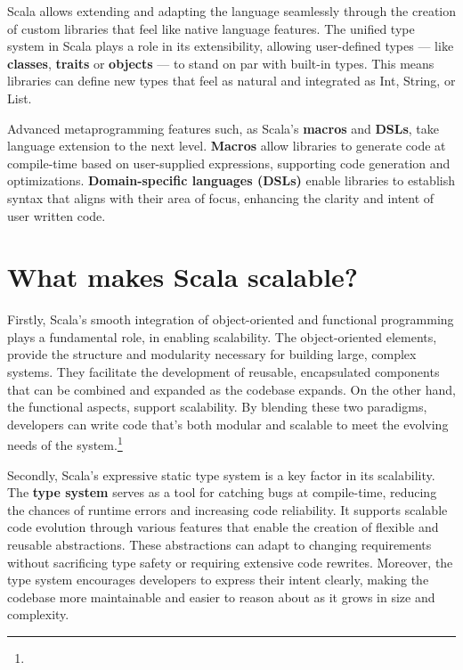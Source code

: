 Scala allows extending and adapting the language seamlessly through the creation of custom libraries that feel like native language features. The unified type system in Scala plays a role in its extensibility, allowing user-defined types — like  \textbf{classes}, \textbf{traits} or \textbf{objects} — to stand on par with built-in types. This means libraries can define new types that feel as natural and integrated as Int, String, or List.\footnotemark{}

Advanced metaprogramming features such, as Scala's \textbf{macros} and \textbf{DSLs}, take language extension to the next level. \textbf{Macros} allow libraries to generate code at compile-time based on user-supplied expressions, supporting code generation and optimizations. \textbf{Domain-specific languages (DSLs)} enable libraries to establish syntax that aligns with their area of focus, enhancing the clarity and intent of user written code.\footnotemark[\value{footnote}] 

\section{What makes Scala scalable?}

Firstly, Scala's smooth integration of object-oriented and functional programming plays a fundamental role, in enabling scalability. The object-oriented elements, provide the structure and modularity necessary for building large, complex systems. They facilitate the development of reusable, encapsulated components that can be combined and expanded as the codebase expands. On the other hand, the functional aspects, support scalability. By blending these two paradigms, developers can write code that's both modular and scalable to meet the evolving needs of the system.\footnote[1]{}

Secondly, Scala's expressive static type system is a key factor in its scalability. The \textbf{type system} serves as a tool for catching bugs at compile-time, reducing the chances of runtime errors and increasing code reliability. It supports scalable code evolution through various features that enable the creation of flexible and reusable abstractions. These abstractions can adapt to changing requirements without sacrificing type safety or requiring extensive code rewrites. Moreover, the type system encourages developers to express their intent clearly, making the codebase more maintainable and easier to reason about as it grows in size and complexity.\footnotemark[1]

